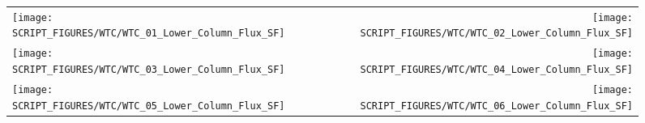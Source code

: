 \begin{figure}[!ht]
\begin{tabular*}{\textwidth}{l@{\extracolsep{\fill}}r}
\texttt{[image: SCRIPT\_FIGURES/WTC/WTC\_01\_Lower\_Column\_Flux\_SF]} &
\texttt{[image: SCRIPT\_FIGURES/WTC/WTC\_02\_Lower\_Column\_Flux\_SF]} \\
\texttt{[image: SCRIPT\_FIGURES/WTC/WTC\_03\_Lower\_Column\_Flux\_SF]} &
\texttt{[image: SCRIPT\_FIGURES/WTC/WTC\_04\_Lower\_Column\_Flux\_SF]} \\
\texttt{[image: SCRIPT\_FIGURES/WTC/WTC\_05\_Lower\_Column\_Flux\_SF]} &
\texttt{[image: SCRIPT\_FIGURES/WTC/WTC\_06\_Lower\_Column\_Flux\_SF]}
\end{tabular*}
\end{figure}

